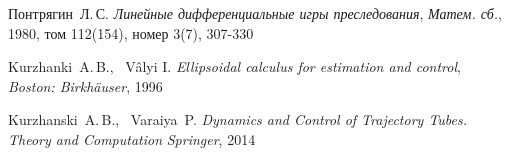\begin{thebibliography}{0}
	
	 Понтрягин~Л.\,С.
	\emph{Линейные дифференциальные игры преследования}, \emph{Матем. сб.}, 1980, том 112(154), номер 3(7), 307-330

	 Kurzhanki~A.\,B., \ Vâlyi I.
	\emph{Ellipsoidal calculus for estimation and control}, \emph{Boston: Birkhäuser}, 1996

	Kurzhanski~A.\,B., \ Varaiya~P. \emph{Dynamics and Control of Trajectory Tubes. Theory and Computation} \emph{Springer}, 2014

\end{thebibliography}